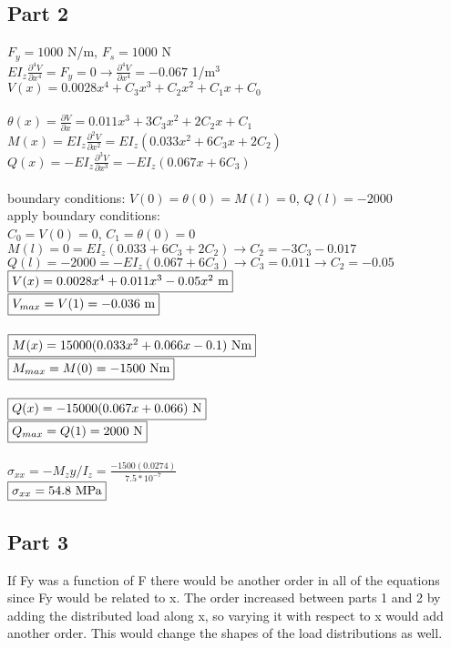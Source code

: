 \documentclass{article}
\begin{document}
\subsection*{Part 2}
$F_y=1000$ N/m, $F_s=1000$ N \\
$EI_z\frac{\partial^4V}{\partial x^4}=F_y=0\rightarrow \frac{\partial^4V}{\partial x^4}=-0.067$
1/m$^3$ \\
$V(x)=0.0028x^4+C_3x^3+C_2x^2+C_1x+C_0$ \\\\
$\theta(x)=\frac{\partial V}{\partial x}=0.011x^3+3C_3x^2+2C_2x+C_1$ \\
$M(x)=EI_z\frac{\partial^2V}{\partial x^2}=EI_z(0.033x^2+6C_3x+2C_2)$ \\
$Q(x)=-EI_z\frac{\partial^3V}{\partial x^3}=-EI_z(0.067x+6C_3)$ \\\\
boundary conditions: $V(0)=\theta(0)=M(l)=0$, $Q(l)=-2000$ \\
apply boundary conditions: \\
$C_0=V(0)=0$, $C_1=\theta(0)=0$ \\
$M(l)=0=EI_z(0.033+6C_3+2C_2)\rightarrow C_2=-3C_3-0.017$ \\
$Q(l)=-2000=-EI_z(0.067+6C_3)\rightarrow C_3=0.011\rightarrow C_2=-0.05$ \\
$\fbox{$V(x)=0.0028x^4+0.011x^3-0.05x^2$ m}$ \\
$\fbox{$V_{max}=V(1)=-0.036$ m}$ \\\\
$\fbox{$M(x)=15000(0.033x^2+0.066x-0.1)$ Nm}$ \\
$\fbox{$M_{max}=M(0)=-1500$ Nm}$ \\\\
$\fbox{$Q(x)=-15000(0.067x+0.066)$ N}$ \\
$\fbox{$Q_{max}=Q(1)=2000$ N}$ \\\\
$\sigma_{xx}=-M_zy/I_z=\frac{-1500(0.0274)}{7.5*10^{-7}}$ \\
$\fbox{$\sigma_{xx}=54.8$ MPa}$

\subsection*{Part 3}
If Fy was a function of F there would be another order in all of the equations since
Fy would be related to x. The order increased between parts 1 and 2 by adding the distributed load
along x, so varying it with respect to x would add another order. This would change the shapes
of the load distributions as well.
\end{document}
